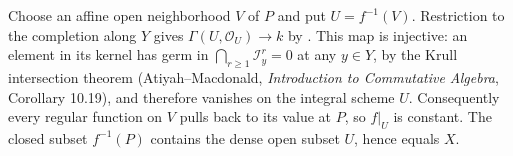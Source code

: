 Choose an affine open neighborhood $V$ of $P$ and put $U=f^{-1}(V)$. Restriction to the completion along $Y$ gives $\Gamma(U,\mathcal O_U)\to k$ by . This map is injective: an element in its kernel has germ in $\bigcap_{r\ge1}\mathcal I_y^r=0$ at any $y\in Y$, by the Krull intersection theorem (Atiyah--Macdonald, \emph{Introduction to Commutative Algebra}, Corollary 10.19), and therefore vanishes on the integral scheme $U$. Consequently every regular function on $V$ pulls back to its value at $P$, so $f|_U$ is constant. The closed subset $f^{-1}(P)$ contains the dense open subset $U$, hence equals $X$.
